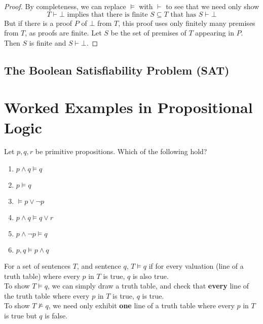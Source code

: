 \documentclass[11pt]{article}
\begin{document}
\begin{proof} 
    By completeness, we can replace $\vDash$ with $\vdash$ to see that we need only show
    \[T \vdash \bot \text{ implies that there is finite } S \subseteq T \text{ that has } S \vdash \bot\]
    But if there is a proof $P$ of $\bot$ from $T$, this proof uses only finitely many premises from $T$, as proofs are finite. Let $S$ be the set of premises of $T$ appearing in $P$. Then $S$ is finite and $S \vdash \bot$.
\end{proof}
\subsection{The Boolean Satisfiability Problem (SAT)}

\pagebreak
\appendix
\section{Worked Examples in Propositional Logic}
\begin{question} \label{q:semanticEntailment}
    Let $p,q,r$ be primitive propositions. Which of the following hold?
    \begin{enumerate}
        \item $p \land q \vDash q$
        \item $p \vDash q$
        \item $\vDash p \lor \neg p$
        \item $p \land q \vDash q \lor r$
        \item $p \land \neg p \vDash q $
        \item $p, q \vDash p \land q $
    \end{enumerate}
\end{question}
\begin{method}
    For a set of sentences $T$, and sentence $q$, $T \vDash q$ if for every valuation (line of a truth table) where every $p$ in $T$ is true, $q$ is also true. 
    \\ To show $T \vDash q$, we can simply draw a truth table, and check that \textbf{every} line of the truth table where every $p$ in $T$ is true, $q$ is true.
    \\ To show $T \not\vDash q$, we need only exhibit \textbf{one} line of a truth table where every $p$ in $T$ is true but $q$ is false.
\end{method}
\end{document}

